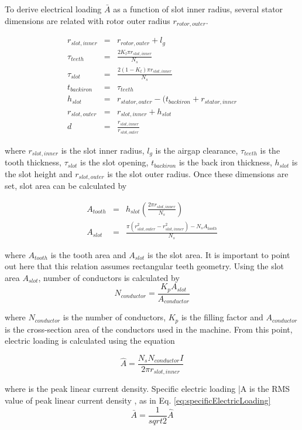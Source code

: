 \documentclass[a4paper, 11pt, titlepage]{article}
\begin{document}
To derive electrical loading $\bar{A}$ as a function of slot inner radius, several stator dimensions are related with rotor outer radius $r_{rotor,outer}$.

\begin{eqnarray}
	r_{slot, inner} &=& r_{rotor,outer} + l_g \\
	\tau_{teeth} &=& \frac{2K_t\pi r_{slot,inner}}{N_s} \\
	\tau_{slot} &=& \frac{2(1-K_t)\pi r_{slot,inner}}{N_s} \\
	t_{back iron} &=& \tau_{teeth} \\
	h_{slot} &=& r_{stator,outer}-(t_{back iron}+r_{stator,inner} \\
	r_{slot,outer} &=& r_{slot,inner}+h_{slot} \\
	d &=& \frac{r_{slot,inner}}{r_{slot,outer}}
	\label{eq:machineDimensions}
\end{eqnarray}

where $r_{slot, inner}$ is the slot inner radius, $l_g$ is the airgap clearance, $\tau_{teeth}$ is the tooth thickness, $\tau_{slot}$ is the slot opening, $t_{back iron}$ is the back iron thickness, $h_{slot}$ is the slot height and $r_{slot,outer}$ is the slot outer radius. Once these dimensions are set, slot area can be calculated by

\begin{eqnarray}
	A_{tooth} &=& h_{slot}(\frac{2\pi r_{slot,inner}}{N_s}) \\
	A_{slot} &=& \frac{\pi(r^2_{slot,outer}-r^2_{slot,inner})-N_sA_{tooth}}{N_s}
\end{eqnarray}

where $A_{tooth}$ is the tooth area and $A_{slot}$ is the slot area. It is important to point out here that this relation assumes rectangular teeth geometry.
Using the slot area $A_{slot}$, number of conductors is calculated by
\begin{equation}
	N_{conductor} = \frac{K_pA_{slot}}{A_{conductor}}
\end{equation}

where  $N_{conductor}$ is the number of conductors, $K_p$ is the filling factor and $A_{conductor}$ is the cross-section area of the conductors used in the machine. From this point, electric loading is calculated using the equation

\begin{equation}
	\hat{A}=\frac{N_sN_{conductor}I}{2\pi r_{slot,inner}}
	\label{eq:peakLinearCurrentDensity}
\end{equation}

where  is the peak linear current density. Specific electric loading \bar{A} is the RMS value of peak linear current density , as in Eq. \ref{eq:specificElectricLoading}
\begin{equation}
	\bar{A}=\frac{1}{sqrt{2}}\hat{A}
	\label{eq:specificElectricLoading}
\end{equation}

\newpage

 

\end{document}

